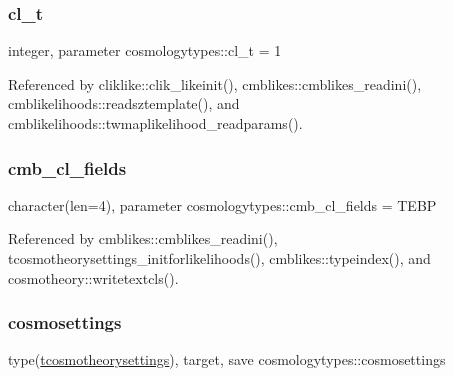 \mbox{\label{namespacecosmologytypes_abddefae1172ac2704cb3a3b22704aaa1}} 
\subsubsection{\texorpdfstring{cl\+\_\+t}{cl\_t}}
{\footnotesize\ttfamily integer, parameter cosmologytypes\+::cl\+\_\+t = 1}



Referenced by cliklike\+::clik\+\_\+likeinit(), cmblikes\+::cmblikes\+\_\+readini(), cmblikelihoods\+::readsztemplate(), and cmblikelihoods\+::twmaplikelihood\+\_\+readparams().

\mbox{\label{namespacecosmologytypes_a59f0f294178f05545934eb7dd63928b6}} 
\subsubsection{\texorpdfstring{cmb\+\_\+cl\+\_\+fields}{cmb\_cl\_fields}}
{\footnotesize\ttfamily character(len=4), parameter cosmologytypes\+::cmb\+\_\+cl\+\_\+fields = \textquotesingle{}T\+E\+BP\textquotesingle{}}



Referenced by cmblikes\+::cmblikes\+\_\+readini(), tcosmotheorysettings\+\_\+initforlikelihoods(), cmblikes\+::typeindex(), and cosmotheory\+::writetextcls().

\mbox{\label{namespacecosmologytypes_a6456ff7e508a263c46d00481a14d3389}} 
\subsubsection{\texorpdfstring{cosmosettings}{cosmosettings}}
{\footnotesize\ttfamily type(\mbox{\hyperlink{structcosmologytypes_1_1tcosmotheorysettings}{tcosmotheorysettings}}), target, save cosmologytypes\+::cosmosettings}



